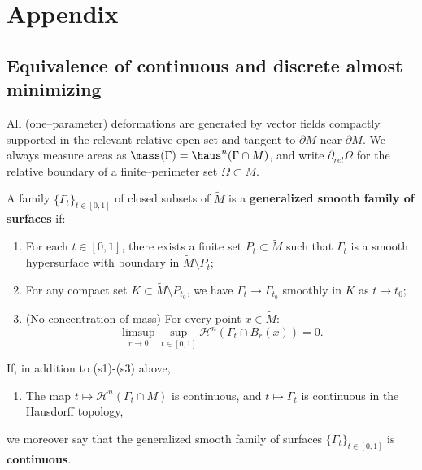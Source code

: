 \chapter{Appendix}\label{ch:interpolation-lemma}\label{appendix:AM}
\section{Equivalence of continuous and discrete almost minimizing }
All (one–parameter) deformations are generated by vector fields compactly supported in the relevant
relative open set and tangent to $\partial M$ near $\partial M$. We always measure areas as
$\mass(\Gamma)=\haus^n(\Gamma\cap M)$, and write $\partial_{rel}\Omega$ for the relative boundary of a
finite–perimeter set $\Omega\subset M$.

\begin{definition}\label{def:family-of-surfaces}
A family $\{\Gamma_t\}_{t \in [0, 1]}$ of closed subsets of $\tilde{M}$ is a \textbf{generalized smooth family of surfaces} if:
\begin{enumerate}
    \item[(s1)] For each $t \in [0, 1]$, there exists a finite set $P_t \subset \tilde{M}$ such that $\Gamma_t$ is a smooth hypersurface with boundary in $\tilde{M} \setminus P_t$;

    \item[(s2)] For any compact set $K \subset \tilde{M} \setminus P_{t_0}$, we have $\Gamma_t \to \Gamma_{t_0}$ smoothly in $K$ as $t \to t_0$;

    \item[(s3)] (No concentration of mass) For every point $x \in \tilde{M}$:
    \begin{equation*}
        \limsup_{r \to 0}\sup_{t \in [0, 1]}\mathcal{H}^n(\Gamma_t\cap B_r(x)) = 0.
    \end{equation*}
\end{enumerate}
If, in addition to (s1)-(s3) above,
\begin{enumerate}
    \item [(s4)] The map $t \mapsto \mathcal{H}^n(\Gamma_t\cap M)$ is continuous, and $t \mapsto \Gamma_t$ is continuous in the Hausdorff topology,
\end{enumerate}
we moreover say that the generalized smooth family of surfaces $\{\Gamma_t\}_{t \in [0, 1]}$ is \textbf{continuous}.
\end{definition}


